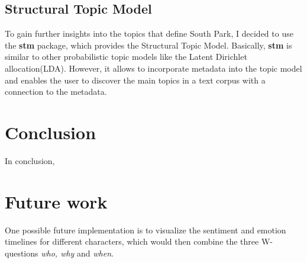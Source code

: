 \documentclass[10pt,a4paper]{article}
\begin{document}
	
	
	
	\subsection{Structural Topic Model}
	
	To gain further insights into the topics that define South Park, I decided to use 
	the \textbf{stm} package, which provides the Structural Topic Model. Basically, \textbf{stm} is similar to other probabilistic topic models like the Latent Dirichlet allocation(LDA). However, it allows to incorporate metadata into the topic model and enables the user to discover the main topics in a text corpus with a connection to the metadata. 
	
	
	\section{Conclusion}
	In conclusion, 

	\section{Future work}
	
	One possible future implementation is to visualize the sentiment and emotion timelines for different characters, which would then combine the three W-questions \textit{who, why}  and \textit{when}.
\end{document}
